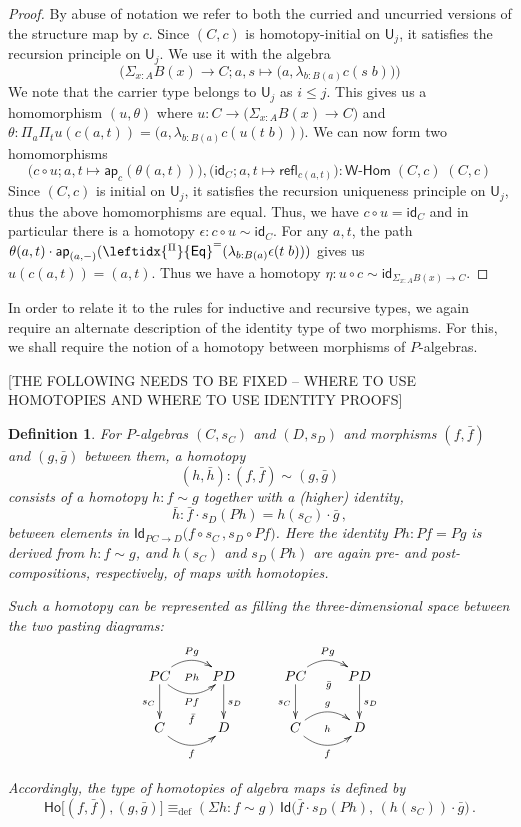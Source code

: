 \documentclass[reqno,10pt,a4paper,oneside]{amsart}
\numberwithin{equation}{section}
\theoremstyle{mythm}
\theoremstyle{mydef}
\newtheorem{definition}[theorem]{Definition}
\theoremstyle{myrmk}
\newcommand{\deq}{\equiv}
\newcommand{\defeq}{\deq_{\mathrm{def}}}
\newcommand{\idfun}[1]{\mathsf{id}_{#1}}
\newcommand{\comp}{\circ}
\newcommand{\ct}{\cdot}
\newcommand{\funext}{\leftidx{^\Pi}{\mathsf{Eq}}^{=}}
\newcommand{\prd}[1]{\Pi_{#1}}
\newcommand{\sm}[1]{\Sigma_{#1}}
\newcommand{\lam}[1]{\lambda_{#1}}
\newcommand{\app}{\mathsf{ap}}
\newcommand{\Id}{\mathsf{Id}}
\newcommand{\id}[1]{\Id_{#1}}
\newcommand{\refl}{\mathsf{refl}}
\newcommand{\UU}{\mathsf{U}}
\newcommand{\Ho}{\mathsf{Ho}}
\newcommand{\WHom}{\mathsf{W}\text{-}\mathsf{Hom}}
\begin{document}
\begin{proof}
By abuse of notation we refer to both the curried and uncurried versions of the structure map by $c$. Since $(C,c)$ is homotopy-initial on $\UU_j$, it satisfies the recursion principle on $\UU_j$. We use it with the algebra \[\Big(\sm{x:A} B(x) \to C; a,s \mapsto \big(a,\lam{b:B(a)} c(s\;b)\big)\Big)\]
We note that the carrier type belongs to $\UU_j$ as $i \leq j$. This gives us a homomorphism $(u,\theta)$ where $u : C \to \big(\sm{x:A} B(x) \to C\big)$ and $\theta : \prd{a}\prd{t} u(c(a,t)) = \big(a,\lam{b:B(a)} c(u(t\;b))\big)$.  We can now form two homomorphisms
\[\big(c \comp u; a,t \mapsto \app_c(\theta(a,t))\big), \big(\idfun{C}; a,t \mapsto \refl_{c(a,t)}\big) : \WHom \; (C,c) \; (C,c)\]
Since $(C,c)$ is initial on $\UU_j$, it satisfies the recursion uniqueness principle on $\UU_j$, thus the above homomorphisms are equal. Thus, we have $c \comp u = \idfun{C}$ and in particular there is a homotopy $\epsilon : c \comp u \sim \idfun{C}$. For any $a,t$, the path $\theta(a,t) \ct \app_{(a,-)}(\funext(\lam{b:B(a)} \epsilon(t\;b)))$ gives us $u(c(a,t)) = (a,t)$. Thus we have a homotopy $\eta : u \comp c \sim \idfun{\sm{x:A} B(x) \to C}$.
\end{proof}



In order to relate it to the rules for inductive and recursive types, we again require an alternate description of the identity type of two morphisms. For this, we shall require the notion of a homotopy between morphisms of $P$-algebras. 

[THE FOLLOWING NEEDS TO BE FIXED -- WHERE TO USE HOMOTOPIES AND WHERE TO USE IDENTITY PROOFS]
\begin{definition}
For $P$-algebras $(C,s_C)$ and $(D,s_D)$ and morphisms $(f, \bar{f})$ and $(g, \bar{g})$ between them, a \emph{homotopy}  $$(h, \bar{h}) : (f, \bar{f}) \sim (g, \bar{g})$$
consists of a homotopy $h : f \sim g$ together with a (higher) identity, 
\[
\bar{h} : \bar{f} \cdot s_D(Ph) = h(s_C)\cdot \bar{g}\, ,
\]
between elements in $\id{PC \rightarrow D}\big( f \circ s_C \, ,  s_{D} \circ Pf \big)$.  Here the identity $Ph : Pf = Pg$ is derived from $h : f \sim g$, and $h(s_C)$ and $s_D(Ph)$ are again pre- and post-compositions, respectively, of maps with homotopies.

Such a homotopy can be represented as filling the three-dimensional space between the two pasting diagrams:
\[
\xymatrix{
PC \ar@/^1pc/[r]^{Pg}   \ar[d]_{s_C}   \ar@/_1pc/[r]_{Pf} \ar@{}[r]|{Ph}
& PD \ar[d]^{s_D}  \\
C  \ar@/_1pc/[r]_f  \ar@{}[r]^{\bar{f}} & D }
\qquad
\xymatrix{
PC \ar@/^1pc/[r]^{Pg}   \ar[d]_{s_C} \ar@{}[r]_(.52){\bar{g}}  & PD \ar[d]^{s_D}  \\
C \ar@/^1pc/[r]^g  \ar@/_1pc/[r]_f  \ar@{}[r]|{h} & D }
\]

Accordingly, the type of homotopies of algebra maps is defined by
\[
\Ho
\big[ (f,\bar{f}), (g, \bar{g})  \big]
 \defeq  
(\Sigma h:  f \sim g) \, \Id\big( \bar{f} \cdot s_D(Ph),\, (h(s_C))\cdot \bar{g} \big) \, .
\]
\end{definition}
\end{document}
